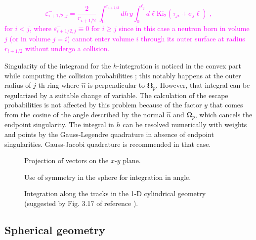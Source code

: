 \documentclass{ictt26}
\begin{document}
\textcolor{magenta}{
	\begin{equation}
	\label{eq:esc_prob_cyij-}
	\varepsilon^-_{i+1/2,j} = \frac{2}{r_{i+1/2}} 
	\displaystyle ~\int_0^{r_{i+1/2}} { dh\, y
		\int_0^{\ell_j}{ d\ell 
			\text{Ki}_2\left(\tau_{ji} + \sigma_j \ell \right)
		}
	} \,\, ,
	\end{equation}
	for $i<j$, where $\varepsilon^-_{i+1/2,j}\equiv 0$ for $i\geq j$ since in this case a neutron born in volume $j$ (or in volume $j=i$) cannot enter volume $i$ through its outer surface at radius $r_{i+1/2}$ without undergo a collision. 
}


Singularity of the integrand for the $h$-integration is noticed in the convex part while computing the collision probabilities \cite{hebert2009applied}; this notably happens at the outer radius of $j$-th ring where $\hat{n}$ is perpendicular to $\mathbf{\Omega}_p$. However, that integral can be regularized by a suitable change of variable. %
The calculation of the escape probabilities is not affected by this problem because of the factor $y$ that comes from the cosine of the angle described by the normal $\hat{n}$ and $\mathbf{\Omega}_p$, which cancels the endpoint singularity. The integral in $h$ can be resolved numerically with weights and points by the Gauss-Legendre quadrature in absence of endpoint singularities. Gauss-Jacobi quadrature is recommended in that case.

\begin{figure}[htbp]
  \centering
  \begin{minipage}[c]{.5\textwidth}
    \centering
    {%
    
    \caption{Projection of vectors on the $x$-$y$ plane.}
    \label{fig:fullframe}
    }%
    \vspace{3mm}
    \vfill
    {%
    
    \caption{Use of symmetry in the sphere for integration in angle.}
    \label{fig:sphere_tracks}
    }%
\end{minipage}%
\begin{minipage}{.5\textwidth}
  \centering
    
    \caption{Integration along the tracks in the 1-D cylindrical geometry (suggested by Fig. 3.17 of reference \cite{hebert2009applied}).}
    \label{fig:cyltracks}
\end{minipage}%
\end{figure}

\subsection{Spherical geometry}
\label{sec:sphere}
\end{document}
